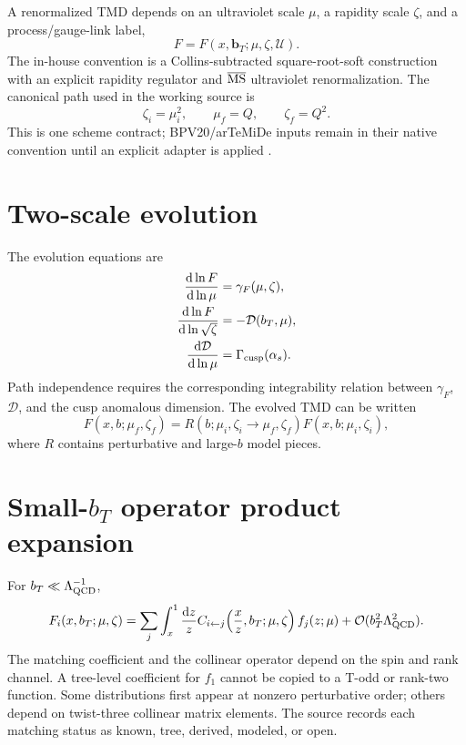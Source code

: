 \documentclass[11pt,oneside]{book}
\newcommand{\bT}{\bm{b}_{T}}
\newcommand{\dd}{\mathrm{d}}
\newcommand{\cO}{\mathcal{O}}
\begin{document}
A renormalized TMD depends on an ultraviolet scale $\mu$, a rapidity scale $\zeta$, and a process/gauge-link label,
\begin{equation}
 F=F(x,\bT;\mu,\zeta,\mathcal U).
\end{equation}
The in-house convention is a Collins-subtracted square-root-soft construction with an explicit rapidity regulator and $\overline{\rm MS}$ ultraviolet renormalization.  The canonical path used in the working source is
\begin{equation}
 \zeta_i=\mu_i^2,
 \qquad
 \mu_f=Q,
 \qquad
 \zeta_f=Q^2.
 \label{eq:canonical-zeta-path}
\end{equation}
This is one scheme contract; BPV20/arTeMiDe inputs remain in their native convention until an explicit adapter is applied \cite{Collins2011,EchevarriaIdilbiScimemi2012,EchevarriaScimemiVladimirov2016,ScimemiVladimirov2018}.

\section{Two-scale evolution}

The evolution equations are
\begin{align}
 \frac{\dd\ln F}{\dd\ln\mu}
 &=\gamma_F(\mu,\zeta),
 \label{eq:mu-evolution}\\
 \frac{\dd\ln F}{\dd\ln\sqrt\zeta}
 &=-\mathcal D(b_T,\mu),
 \label{eq:cs-evolution}\\
 \frac{\dd\mathcal D}{\dd\ln\mu}
 &=\Gamma_{\rm cusp}(\alpha_s).
 \label{eq:cs-consistency}
\end{align}
Path independence requires the corresponding integrability relation between $\gamma_F$, $\mathcal D$, and the cusp anomalous dimension.  The evolved TMD can be written
\begin{equation}
 F(x,b;\mu_f,\zeta_f)
 =R(b;\mu_i,\zeta_i\to\mu_f,\zeta_f)
 F(x,b;\mu_i,\zeta_i),
 \label{eq:evolution-kernel}
\end{equation}
where $R$ contains perturbative and large-$b$ model pieces.

\section{\texorpdfstring{Small-$b_T$}{Small-bT} operator product expansion}

For $b_T\ll\Lambda_{\rm QCD}^{-1}$,
\begin{equation}
 F_i(x,b_T;\mu,\zeta)
 =\sum_j\int_x^1\frac{\dd z}{z}
 C_{i\leftarrow j}\!\left(\frac{x}{z},b_T;\mu,\zeta\right)
 f_j(z;\mu)
 +\cO(b_T^2\Lambda_{\rm QCD}^2).
 \label{eq:smallb-OPE}
\end{equation}
The matching coefficient and the collinear operator depend on the spin and rank channel.  A tree-level coefficient for $f_1$ cannot be copied to a T-odd or rank-two function.  Some distributions first appear at nonzero perturbative order; others depend on twist-three collinear matrix elements.  The source records each matching status as known, tree, derived, modeled, or open.
\end{document}
